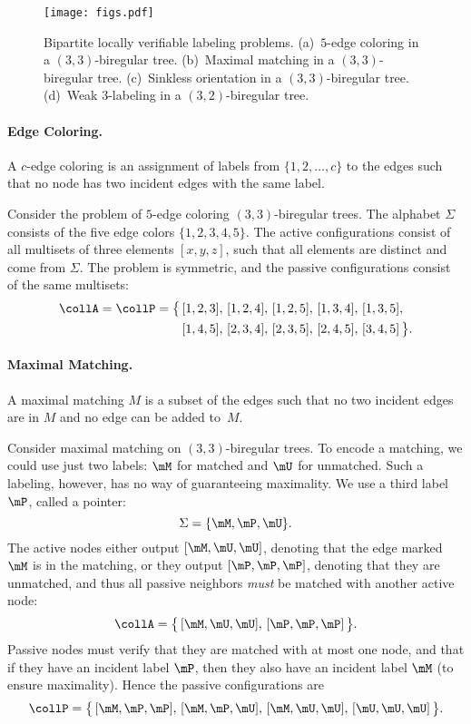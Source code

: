 \begin{figure}
	\centering
	\texttt{[image: figs.pdf]}
	\caption{Bipartite locally verifiable labeling problems. (a)~$5$-edge coloring in a $(3,3)$-biregular tree. (b)~Maximal matching in a $(3,3)$-biregular tree. (c)~Sinkless orientation in a $(3,3)$-biregular tree. (d)~Weak 3-labeling in a $(3,2)$-biregular tree.} \label{fig:bipartite-problem-examples}
\end{figure}

\paragraph{Edge Coloring.} A $c$-edge coloring is an assignment of labels from $\{1,2,\dotsc,c\}$ to the edges such that no node has two incident edges with the same label. 

Consider the problem of $5$-edge coloring $(3,3)$-biregular trees. The alphabet $\Sigma$ consists of the five edge colors $\{ 1, 2, 3, 4, 5 \}$. The active configurations consist of all multisets of three elements $[x,y,z]$, such that all elements are distinct and come from $\Sigma$. The problem is symmetric, and the passive configurations consist of the same multisets:
\[
\begin{split}
	\collA = \collP = \bigl\{\,
		&[1,2,3],\,
		[1,2,4],\,
		[1,2,5],\,
		[1,3,4],\,
		[1,3,5], \\
		&[1,4,5],\,
		[2,3,4],\,
		[2,3,5],\,
		[2,4,5],\,
		[3,4,5]
	\,\bigr\}.
\end{split}
\]

\paragraph{Maximal Matching.} A maximal matching $M$ is a subset of the edges such that no two incident edges are in $M$ and no edge can be added to~$M$.

Consider maximal matching on $(3,3)$-biregular trees. To encode a matching, we could use just two labels: $\mM$ for matched and $\mU$ for unmatched. Such a labeling, however, has no way of guaranteeing maximality. We use a third label $\mP$, called a pointer:
\[
	\Sigma = \{ \mM, \mP, \mU \}.
\]
The active nodes either output $[ \mM, \mU, \mU ]$, denoting that the edge marked $\mM$ is in  the matching, or they output $[\mP, \mP, \mP]$, denoting that they are unmatched, and thus all passive neighbors \emph{must} be matched with another active node:
\[
	\collA = \bigl\{\, [ \mM, \mU, \mU ], \, [\mP, \mP, \mP] \, \bigr\}.
\]
Passive nodes must verify that they are matched with at most one node, and that if they have an incident label $\mP$, then they also have an incident label $\mM$ (to ensure maximality). Hence the passive configurations are
\[
	\collP = \bigl\{\,
		[ \mM, \mP, \mP ],\,
		[ \mM, \mP, \mU ],\,
		[ \mM, \mU, \mU ],\,
		[ \mU, \mU, \mU ]
	\,\bigr\}.
\]

